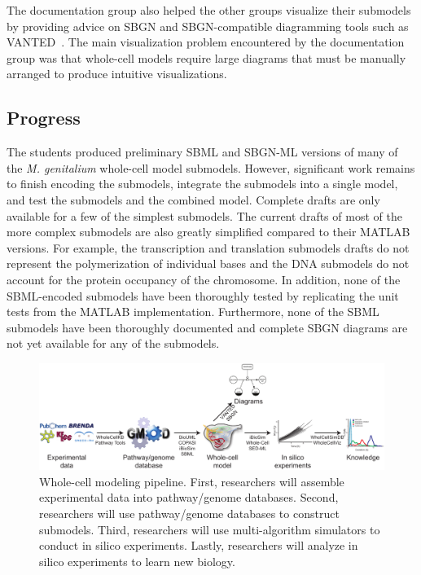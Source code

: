 \documentclass[journal,transmag]{IEEEtran}
\begin{document}
The documentation group also helped the other groups visualize their submodels by providing advice on SBGN and SBGN-compatible diagramming tools such as VANTED~\cite{Rohn2012}.
The main visualization problem encountered by the documentation group was that whole-cell models require large diagrams that must be manually arranged to produce intuitive visualizations.

\subsection{Progress}
The students produced preliminary SBML and SBGN-ML versions of many of the \textit{M. genitalium} whole-cell model submodels. However, significant work remains to finish encoding the submodels, integrate the submodels into a single model, and test the submodels and the combined model. Complete drafts are only available for a few of the simplest submodels. The current drafts of most of the more complex submodels are also greatly simplified compared to their MATLAB versions. For example, the transcription and translation submodels drafts do not represent the polymerization of individual bases and the DNA submodels do not account for the protein occupancy of the chromosome. In addition, none of the SBML-encoded submodels have been thoroughly tested by replicating the unit tests from the MATLAB implementation. Furthermore, none of the SBML submodels have been thoroughly documented and complete SBGN diagrams are not yet available for any of the submodels.

\begin{figure}[bt!]
\centering
\includegraphics[width=\textwidth]{figure1/figure1.pdf}
\caption{\label{fig:1} Whole-cell modeling pipeline. First, researchers will assemble experimental data into pathway/genome databases. Second, researchers will use pathway/genome databases to construct submodels. Third, researchers will use multi-algorithm simulators to conduct in silico experiments. Lastly, researchers will analyze in silico experiments to learn new biology.}
\end{figure}
\end{document}
